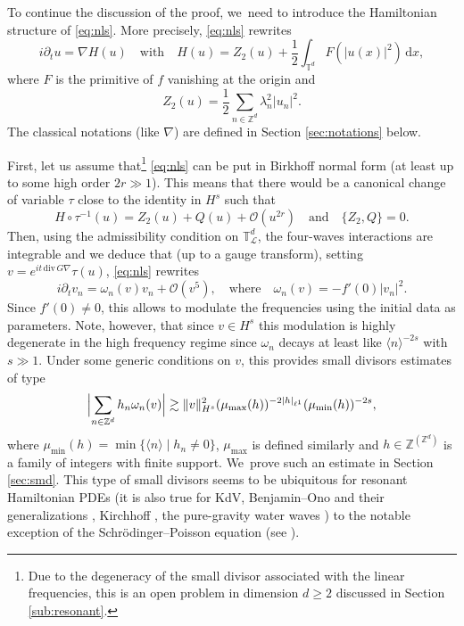 \documentclass[JEP,XML,SOM,Unicode,published]{cedram}
\theoremstyle{plain}
\theoremstyle{definition}
\newcommand{\1}{\mathbf{1}}
\begin{document}
To continue the discussion of the proof, we~need to introduce the Hamiltonian structure of \eqref{eq:nls}. More precisely, \eqref{eq:nls} rewrites
\begin{equation}
\label{eq:hamNLS}
i\partial_t u = \nabla H(u) \quad \mathrm{with} \quad H(u) = Z_2(u)+ \frac12 \int_{\mathbb{T}^d} F(|u(x)|^2) \, \mathrm{d}x,
\end{equation}
where $F$ is the primitive of $f$ vanishing at the origin and
\[
Z_2(u) = \frac12 \sum_{n\in \mathbb{Z}^d} \lambda_n^2 |u_n|^2.
\]
The classical notations (like $\nabla$) are defined in Section \ref{sec:notations} below.

 First, let us assume that\footnote{Due to the degeneracy of the small divisor associated with the linear frequencies, this is an open problem in dimension $d\geq 2$ discussed in Section \ref{sub:resonant}.} \eqref{eq:nls} can be put in Birkhoff normal form (at least up to some high order $2r \gg 1$). This means that there would be a canonical change of variable $\tau$ close to the identity in $H^s$ such that
\begin{equation}
\label{eq:Birk_reve}
H\circ \tau^{-1}(u) = Z_2(u) + Q(u) + \mathcal{O}(u^{2r}) \quad \mathrm{and} \quad \{ Z_2,Q \} =0.
\end{equation}
Then, using the admissibility condition on $\mathbb{T}^d_{\mathscr{L}}$, the four-waves interactions are integrable and we deduce that (up to a gauge transform), setting $v=e^{it \, \mathrm{div} \, G \nabla }\tau(u)$, \eqref{eq:nls} rewrites
\[
i\partial_t v_n = \omega_n(v) v_n + \mathcal{O}(v^5), \quad \mathrm{where} \quad \omega_n(v) = - f'(0) |v_n|^2.
\]
Since $f'(0)\neq 0$, this allows to modulate the frequencies using the initial data as parameters. Note, however, that since $v\in H^s$ this modulation is highly degenerate in the high frequency regime since $\omega_n$ decays at least like $\langle n\rangle^{-2s}$ with $s\gg 1$. Under some generic conditions on $v$, this provides small divisors estimates of type
\begin{equation}
\label{eq:discussion_sd}
\Bigl| \sum_{n\in \mathbb{Z}^d} h_n \omega_{n}(v) \Bigr| \gtrsim \| v\|_{H^s}^2 (\mu_{\max}(h))^{-2|h|_{\ell^1}} (\mu_{\min}(h))^{-2s},
\end{equation}
where $\mu_{\min}(h) = \min \{ \langle n \rangle \mid h_n \neq 0 \}$, $\mu_{\max}$ is defined similarly and $h\in \mathbb{Z}^{(\mathbb{Z}^d)}$ is a family of integers with finite support. We~prove such an estimate in Section \ref{sec:smd}. This type of small divisors seems to be ubiquitous for resonant Hamiltonian PDEs (\eg it is also true for KdV, Benjamin--Ono and their generalizations \cite{KtA}, Kirchhoff \cite{BH22}, the pure-gravity water waves \cite{BFP23}) to the notable exception of the Schrödinger--Poisson equation (see \cite{KillBill,zhiqiang}).
\end{document}
